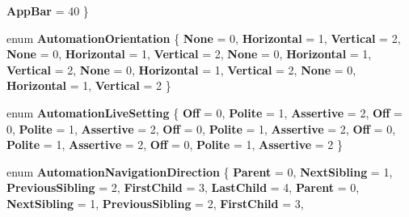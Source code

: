 \begin{DoxyCompactItemize}
\newline
{\bfseries App\+Bar} = 40
 \}
\item 
\mbox{\label{namespace_windows_1_1_u_i_1_1_xaml_1_1_automation_1_1_peers_a7279523ced8212af46486c324a89ee2b}} 
enum {\bfseries Automation\+Orientation} \{ \newline
{\bfseries None} = 0, 
{\bfseries Horizontal} = 1, 
{\bfseries Vertical} = 2, 
{\bfseries None} = 0, 
\newline
{\bfseries Horizontal} = 1, 
{\bfseries Vertical} = 2, 
{\bfseries None} = 0, 
{\bfseries Horizontal} = 1, 
\newline
{\bfseries Vertical} = 2, 
{\bfseries None} = 0, 
{\bfseries Horizontal} = 1, 
{\bfseries Vertical} = 2, 
\newline
{\bfseries None} = 0, 
{\bfseries Horizontal} = 1, 
{\bfseries Vertical} = 2
 \}
\item 
\mbox{\label{namespace_windows_1_1_u_i_1_1_xaml_1_1_automation_1_1_peers_a3a01b3ce21eb110af096e897e16e1c78}} 
enum {\bfseries Automation\+Live\+Setting} \{ \newline
{\bfseries Off} = 0, 
{\bfseries Polite} = 1, 
{\bfseries Assertive} = 2, 
{\bfseries Off} = 0, 
\newline
{\bfseries Polite} = 1, 
{\bfseries Assertive} = 2, 
{\bfseries Off} = 0, 
{\bfseries Polite} = 1, 
\newline
{\bfseries Assertive} = 2, 
{\bfseries Off} = 0, 
{\bfseries Polite} = 1, 
{\bfseries Assertive} = 2, 
\newline
{\bfseries Off} = 0, 
{\bfseries Polite} = 1, 
{\bfseries Assertive} = 2
 \}
\item 
\mbox{\label{namespace_windows_1_1_u_i_1_1_xaml_1_1_automation_1_1_peers_a9b8626451e301972334ca5697b978934}} 
enum {\bfseries Automation\+Navigation\+Direction} \{ \newline
{\bfseries Parent} = 0, 
{\bfseries Next\+Sibling} = 1, 
{\bfseries Previous\+Sibling} = 2, 
{\bfseries First\+Child} = 3, 
\newline
{\bfseries Last\+Child} = 4, 
{\bfseries Parent} = 0, 
{\bfseries Next\+Sibling} = 1, 
{\bfseries Previous\+Sibling} = 2, 
\newline
{\bfseries First\+Child} = 3, 

\end{DoxyCompactItemize}
